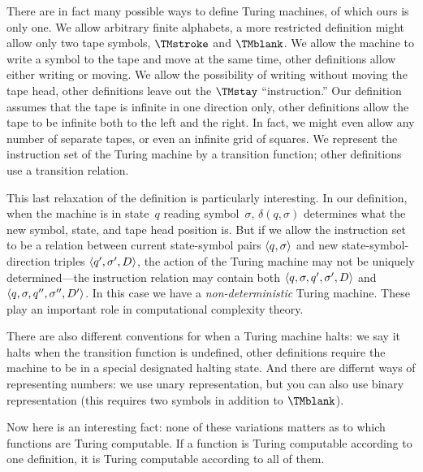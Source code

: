 \documentclass[../../../include/open-logic-section]{subfiles}
\begin{document}

There are in fact many possible ways to define Turing machines, of
which ours is only one.  We allow arbitrary finite alphabets, a more
restricted definition might allow only two tape symbols, $\TMstroke$
and $\TMblank$.  We allow the machine to write a symbol to the tape
and move at the same time, other definitions allow either writing or
moving.  We allow the possibility of writing without moving the tape
head, other definitions leave out the $\TMstay$ ``instruction.''  Our
definition assumes that the tape is infinite in one direction only,
other definitions allow the tape to be infinite both to the left and
the right. In fact, we might even allow any number of separate tapes,
or even an infinite grid of squares.  We represent the instruction set
of the Turing machine by a transition function; other definitions use
a transition relation.

This last relaxation of the definition is particularly interesting.
In our definition, when the machine is in state~$q$ reading
symbol~$\sigma$, $\delta(q, \sigma)$ determines what the new symbol,
state, and tape head position is.  But if we allow the instruction set
to be a relation between current state-symbol pairs $\langle q,
  \sigma \rangle$ and new state-symbol-direction triples $\langle q', \sigma',
  D \rangle$, the action of the Turing machine may not be uniquely
determined---the instruction relation may contain both $\langle q,
  \sigma, q', \sigma', D \rangle$ and $\langle q, \sigma, q'', \sigma'', D' \rangle$.
In this case we have a \emph{non-deterministic} Turing machine.  These
play an important role in computational complexity theory.

There are also different conventions for when a Turing machine halts:
we say it halts when the transition function is undefined, other
definitions require the machine to be in a special designated halting
state.  And there are differnt ways of representing numbers: we use
unary representation, but you can also use binary representation (this
requires two symbols in addition to $\TMblank$).

Now here is an interesting fact: none of these variations matters as
to which functions are Turing computable. If a function is Turing
computable according to one definition, it is Turing computable
according to all of them.
\end{document}
